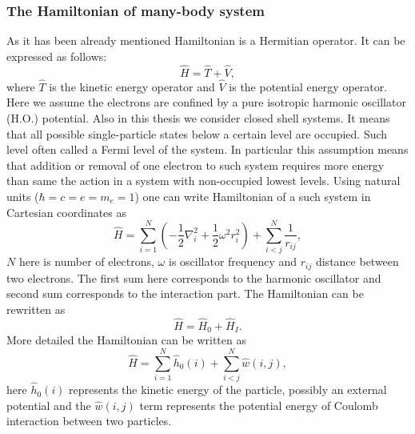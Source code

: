 \documentclass[twoside,english]{uiofysmaster}
\theoremstyle{definition}
\begin{document}
\subsubsection{The Hamiltonian of many-body system} \label{sec:manybody}
As it has been already mentioned Hamiltonian is a Hermitian operator. It can be expressed as follows:
\begin{equation}
\hat{H}=\hat{T}+\hat{V},
\end{equation}
where $\hat{T}$ is the kinetic energy operator and $\hat{V}$ is the potential energy operator. \\
Here we assume the electrons are confined by a pure isotropic harmonic oscillator (H.O.) potential. Also in this thesis we consider closed shell systems. It means that all possible single-particle states below a certain level are occupied. Such level often called a Fermi level of the system. In particular this assumption means that addition or removal of one electron to such system requires more energy than same the action in a system with non-occupied lowest levels. 
Using natural units ($\hbar=c=e=m_e=1$) one can write Hamiltonian of a such system in Cartesian coordinates as
\begin{equation}
\label{eq:finalH}
\hat{H}=\sum_{i=1}^{N} \left(  -\frac{1}{2} \nabla_i^2 + \frac{1}{2} \omega^2r_i^2  \right)+\sum_{i<j}^{N}\frac{1}{r_{ij}},
\end{equation}
$N$ here is number of electrons, $\omega$ is oscillator frequency and $r_{ij}$ distance between two electrons. The first sum here corresponds to the harmonic oscillator and second sum corresponds to the interaction part. The Hamiltonian can be rewritten as
\begin{equation}
\hat{H}=\hat{H}_0+\hat{H}_I .
\end{equation}
More detailed the Hamiltonian can be written as 
\begin{equation}
\hat{H} = \sum_{i=1}^{N}\hat{h}_0(i) + \sum_{i < j}^{N}\hat{w}(i,j),
\label{H1H2}
\end{equation}
here $ \hat{h}_0(i) $ represents the kinetic energy of the particle, possibly an external potential and the $\hat{w}(i,j)$ term represents the potential energy of Coulomb interaction between two particles. 
\end{document}
